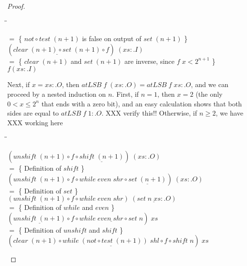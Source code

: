\documentclass{jfp}
\newcommand{\Conid}[1]{\mathit{#1}}
\newcommand{\Varid}[1]{\mathit{#1}}
\renewcommand{\leq}{\leqslant}
\renewcommand{\geq}{\geqslant}
\newenvironment{sproof}{%
    \begin{tabbing}
    \phantom{$\equiv$} \= \qquad\qquad\qquad\qquad\qquad \= \kill
}{
    \end{tabbing}
}
\newcommand{\stmt}[1]{\> \ensuremath{#1} \\}
\newcommand{\reason}[2]{\ensuremath{#1} \>\> \{ \quad #2 \quad \} \\}
\theoremstyle{definition}
\theoremstyle{remark}
\begin{document}
\begin{proof}
\begin{sproof}
    \reason{=}{\ensuremath{not\mathbin{\circ}\Varid{test}\;(\Varid{n}\mathbin{+}\mathrm{1})} is false on output of \ensuremath{\Varid{set}\;(\Varid{n}\mathbin{+}\mathrm{1})}}
    \stmt{\ensuremath{(\underline{\Varid{clear}\;(\Varid{n}\mathbin{+}\mathrm{1})\mathbin{\circ}\Varid{set}\;(\Varid{n}\mathbin{+}\mathrm{1})}\mathbin{\circ}\Varid{f})\;(\Varid{xs}\mathrel{:\!.}\Conid{I})}}
    \reason{=}{\ensuremath{\Varid{clear}\;(\Varid{n}\mathbin{+}\mathrm{1})} and \ensuremath{\Varid{set}\;(\Varid{n}\mathbin{+}\mathrm{1})} are inverse, since $\ensuremath{\Varid{f}\;\Varid{x}} < 2^{n+1}$}
    \stmt{f (xs :. I)}
  \end{sproof}
  Next, if \ensuremath{\Varid{x}\mathrel{=}\Varid{xs}\mathrel{:\!.}\Conid{O}}, then \ensuremath{\Varid{atLSB}\;\Varid{f}\;(\Varid{xs}\mathrel{:\!.}\Conid{O})\mathrel{=}\Varid{atLSB}\;\Varid{f}\;\Varid{xs}\mathrel{:\!.}\Conid{O}},
  and we can proceed by a nested induction on $n$.  First, if $n = 1$,
  then $x = 2$ (the only $0 < x \leq 2^n$ that ends with a zero bit),
  and an easy calculation shows that both sides are equal to \ensuremath{\Varid{atLSB}\;\Varid{f}\;\mathrm{1}\mathrel{:\!.}\Conid{O}}.  XXX verify this!!   Otherwise, if $n \geq 2$, we have  XXX working here
  \begin{sproof}
    \stmt{\ensuremath{(\Varid{unshift}\;(\Varid{n}\mathbin{+}\mathrm{1})\mathbin{\circ}\Varid{f}\mathbin{\circ}\underline{\Varid{shift}\;(\Varid{n}\mathbin{+}\mathrm{1})})\;(\Varid{xs}\mathrel{:\!.}\Conid{O})}}
    \reason{=}{Definition of \ensuremath{\Varid{shift}}}
    \stmt{\ensuremath{(\Varid{unshift}\;(\Varid{n}\mathbin{+}\mathrm{1})\mathbin{\circ}\Varid{f}\mathbin{\circ}\Varid{while}\;\Varid{even}\;\Varid{shr}\mathbin{\circ}\underline{\Varid{set}\;(\Varid{n}\mathbin{+}\mathrm{1})})\;(\Varid{xs}\mathrel{:\!.}\Conid{O})}}
    \reason{=}{Definition of \ensuremath{\Varid{set}}}
    \stmt{\ensuremath{(\Varid{unshift}\;(\Varid{n}\mathbin{+}\mathrm{1})\mathbin{\circ}\Varid{f}\mathbin{\circ}\Varid{while}\;\Varid{even}\;\Varid{shr})\;(\underline{\Varid{set}\;\Varid{n}\;\Varid{xs}\mathrel{:\!.}\Conid{O}})}}
    \reason{=}{Definition of \ensuremath{\Varid{while}} and \ensuremath{\Varid{even}}}
    \stmt{\ensuremath{(\underline{\Varid{unshift}\;(\Varid{n}\mathbin{+}\mathrm{1})}\mathbin{\circ}\Varid{f}\mathbin{\circ}\underline{\Varid{while}\;\Varid{even}\;\Varid{shr}\mathbin{\circ}\Varid{set}\;\Varid{n}})\;\Varid{xs}}}
    \reason{=}{Definition of \ensuremath{\Varid{unshift}} and \ensuremath{\Varid{shift}}}
    \stmt{\ensuremath{(\Varid{clear}\;(\Varid{n}\mathbin{+}\mathrm{1})\mathbin{\circ}\underline{\Varid{while}\;(not\mathbin{\circ}\Varid{test}\;(\Varid{n}\mathbin{+}\mathrm{1}))\;\Varid{shl}}\mathbin{\circ}\Varid{f}\mathbin{\circ}\Varid{shift}\;\Varid{n})\;\Varid{xs}}}

\end{sproof}
\end{proof}
\end{document}
